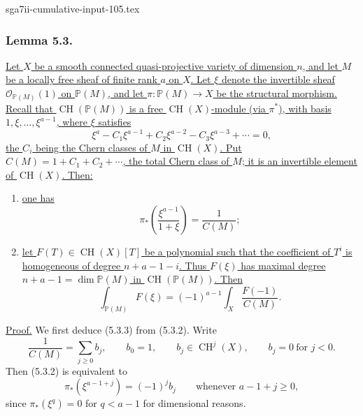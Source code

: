 \begin{filecontents*}{sga7ii-cumulative-input-105.tex}
\subsubsection*{Lemma 5.3.}
\underline{Let $X$ be a smooth connected quasi-projective variety of
dimension $n$, and let $M$ be a locally free sheaf of finite rank $a$
on $X$.  Let $\xi$ denote the invertible sheaf
$\mathcal O_{\mathbb P(M)}(1)$ on $\mathbb P(M)$, and let
$\pi:\mathbb P(M)\to X$ be the structural morphism.  Recall that
$\operatorname{CH}(\mathbb P(M))$ is a free
$\operatorname{CH}(X)$-module (via $\pi^*$), with basis
$1,\xi,\ldots,\xi^{a-1}$, where $\xi$ satisfies}
\begin{equation}\tag{5.3.1}
\xi^a-C_1\xi^{a-1}+C_2\xi^{a-2}-C_3\xi^{a-3}+\cdots=0,
\end{equation}
\underline{the $C_i$ being the Chern classes of $M$ in
$\operatorname{CH}(X)$.  Put
$C(M)=1+C_1+C_2+\cdots$, the total Chern class of $M$; it is an
invertible element of $\operatorname{CH}(X)$.  Then:}

\begin{enumerate}
\item[(i)] \underline{one has}
\begin{equation}\tag{5.3.2}
\pi_*\!\left(\frac{\xi^{a-1}}{1+\xi}\right)
=\frac{1}{C(M)};
\end{equation}
\item[(ii)] \underline{let
$F(T)\in\operatorname{CH}(X)[T]$ be a polynomial such that the
coefficient of $T^i$ is homogeneous of degree $n+a-1-i$.  Thus
$F(\xi)$ has maximal degree
$n+a-1=\dim\mathbb P(M)$ in
$\operatorname{CH}(\mathbb P(M))$.  Then}
\begin{equation}\tag{5.3.3}
\int_{\mathbb P(M)}F(\xi)
=(-1)^{a-1}\int_X\frac{F(-1)}{C(M)}.
\end{equation}
\end{enumerate}

\noindent\underline{Proof.}
We first deduce (5.3.3) from (5.3.2).  Write
\begin{equation}\tag{5.3.4}
\frac{1}{C(M)}=\sum_{j\geq0}b_j,\qquad
b_0=1,\qquad
b_j\in\operatorname{CH}^j(X),\qquad
b_j=0\ \text{for }j<0.
\end{equation}
Then (5.3.2) is equivalent to
\begin{equation}\tag{5.3.5}
\pi_*(\xi^{a-1+j})=(-1)^jb_j
\qquad\text{whenever }a-1+j\geq0,
\end{equation}
since $\pi_*(\xi^q)=0$ for $q<a-1$ for dimensional reasons.


\end{filecontents*}
